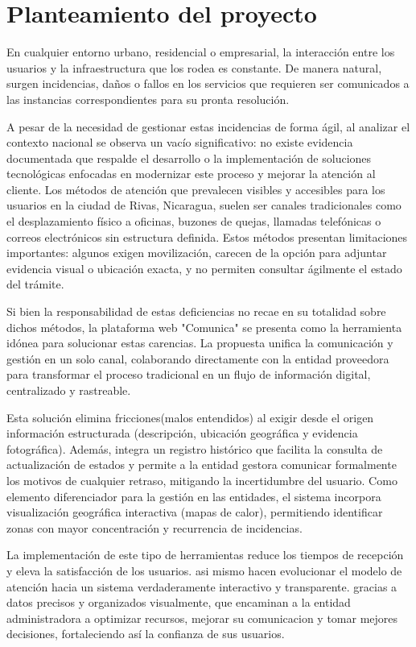\clearpage


\section{Planteamiento del proyecto}
  \label{subsec:planteamiento}
En cualquier entorno urbano, residencial o empresarial, la interacción entre los usuarios y la infraestructura que los rodea es constante. De manera natural, surgen incidencias, daños o fallos en los servicios que requieren ser comunicados a las instancias correspondientes para su pronta resolución.

A pesar de la necesidad de gestionar estas incidencias de forma ágil, al analizar el contexto nacional se observa un vacío significativo: no existe evidencia documentada que respalde el desarrollo o la implementación de soluciones tecnológicas enfocadas en modernizar este proceso y mejorar la atención al cliente. Los métodos de atención que prevalecen visibles y accesibles para los usuarios en la ciudad de Rivas, Nicaragua, suelen ser canales tradicionales como el desplazamiento físico a oficinas, buzones de quejas, llamadas telefónicas o correos electrónicos sin estructura definida. Estos métodos presentan limitaciones importantes: algunos exigen movilización, carecen de la opción para adjuntar evidencia visual o ubicación exacta, y no permiten consultar ágilmente el estado del trámite.

Si bien la responsabilidad de estas deficiencias no recae en su totalidad sobre dichos métodos, la plataforma web "Comunica" se presenta como la herramienta idónea para solucionar estas carencias. La propuesta unifica la comunicación y gestión en un solo canal, colaborando directamente con la entidad proveedora para transformar el proceso tradicional en un flujo de información digital, centralizado y rastreable.

Esta solución elimina fricciones(malos entendidos) al exigir desde el origen información estructurada (descripción, ubicación geográfica y evidencia fotográfica). Además, integra un registro histórico que facilita la consulta de actualización de estados y permite a la entidad gestora comunicar formalmente los motivos de cualquier retraso, mitigando la incertidumbre del usuario. Como elemento diferenciador para la gestión en las entidades, el sistema incorpora visualización geográfica interactiva (mapas de calor), permitiendo identificar zonas con mayor concentración y recurrencia de incidencias.

 La implementación de este tipo de herramientas reduce los tiempos de recepción y eleva la satisfacción de los usuarios\parencite{parrales2025desarrollo}. asi mismo hacen evolucionar el modelo de atención hacia un sistema verdaderamente interactivo y transparente. gracias a datos precisos y organizados visualmente, que encaminan a la entidad administradora a optimizar recursos, mejorar su comunicacion y tomar mejores decisiones, fortaleciendo así la confianza de sus usuarios.

